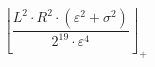 \[\left\lfloor \frac{L^{2} \cdot R^{2} \cdot \left(\varepsilon^{2} + \sigma^{2}\right)}{2^{19} \cdot \varepsilon^{4}} \right\rfloor_{+}\]
